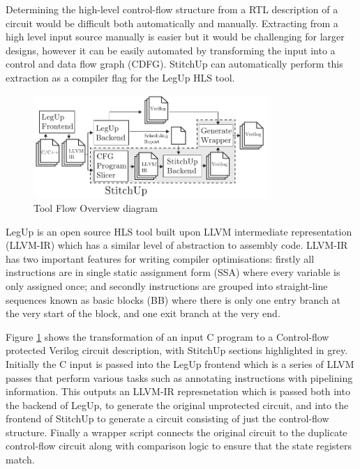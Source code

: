 Determining the high-level control-flow structure from a RTL description
of a circuit would be difficult both automatically and manually.
Extracting from a high level input source manually is easier but it would
be challenging for larger designs, however it can be easily automated by
transforming the input into a control and data flow graph (CDFG).
StitchUp can automatically perform this extraction as a compiler flag
for the LegUp HLS tool.

\begin{figure}[h]
\centering
\includegraphics[width=3.5in]{./imgs/tool-flow.pdf}
\caption{Tool Flow Overview diagram}
\label{fig:tool_flow_diagram}
\end{figure}

LegUp is an open source HLS tool built upon LLVM intermediate representation (LLVM-IR) which has
a similar level of abstraction to assembly code.
LLVM-IR has two important features for writing compiler optimisations:
firstly all instructions are in single static assignment form (SSA) where every variable is only
assigned once; and secondly instructions are grouped into straight-line sequences known as basic blocks (BB)
where there is only one entry branch at the very start of the block, and one exit branch at the very end.

Figure \ref{fig:tool_flow_diagram} shows the transformation of an input C program
to a Control-flow protected
Verilog circuit description, with StitchUp sections highlighted in grey.
Initially the C input is passed into the LegUp frontend which is
a series of LLVM passes that
perform various tasks such as annotating instructions with pipelining information.
This outputs an LLVM-IR represnetation which is passed both into the backend of LegUp,
to generate the
original unprotected circuit, and into the frontend of StitchUp to generate a circuit
consisting of just the control-flow structure.
Finally a wrapper script connects the original circuit to the duplicate control-flow circuit
along with comparison logic to ensure that the state registers match.

